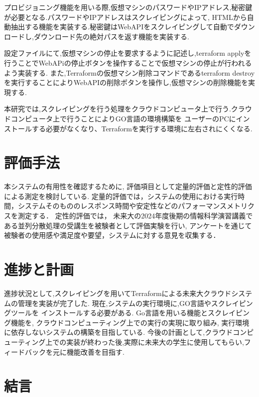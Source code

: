 \documentclass[11pt]{ujarticle}\sloppy
\begin{document}
プロビジョニング機能を用いる際,仮想マシンのパスワードやIPアドレス,秘密鍵が必要となる.パスワードやIPアドレスはスクレイピングによって,
HTMLから自動抽出する機能を実装する.秘密鍵はWebAPIをスクレイピングして自動でダウンロードし,ダウンロード先の絶対パスを返す機能を実装する.


設定ファイルにて,仮想マシンの停止を要求するように記述し,terraform applyを行うことでWebAPiの停止ボタンを操作することで仮想マシンの停止が行われるよう実装する.
また,Terraformの仮想マシン削除コマンドであるterraform destroyを実行することによりWebAPIの削除ボタンを操作し,仮想マシンの削除機能を実現する.


本研究では,スクレイピングを行う処理をクラウドコンピュータ上で行う.クラウドコンピュータ上で行うことによりGO言語の環境構築を
ユーザーのPCにインストールする必要がなくなり、Terraformを実行する環境に左右されにくくなる.



\section{評価手法}

本システムの有用性を確認するために,
評価項目として定量的評価と定性的評価による測定を検討している.
定量的評価では，システムの使用における実行時間，システムそのもののレスポンス時間や安定性などのパフォーマンスメトリクスを測定する．
定性的評価では，
未来大の2024年度後期の情報科学演習講義である並列分散処理の受講生を被験者として評価実験を行い,
アンケートを通じて被験者の使用感や満足度や要望，システムに対する意見を収集する．



\section{進捗と計画}

進捗状況として,スクレイピングを用いてTerraformによる未来大クラウドシステムの管理を実装が完了した.
現在,システムの実行環境に,GO言語やスクレイピングツールを
インストールする必要がある.
Go言語を用いる機能とスクレイピング機能を,
クラウドコンピューティング上での実行の実現に取り組み,
実行環境に依存しないシステムの構築を目指している.
今後の計画として,クラウドコンピューティング上での実装が終わった後,実際に未来大の学生に使用してもらい,フィードバックを元に機能改善を目指す.


\section{結言}
\end{document}
